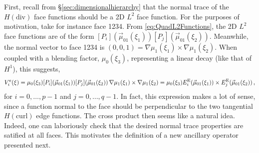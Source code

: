 First, recall from \S\ref{sec:dimensionalhierarchy} that the normal trace of the $H(\mathrm{div})$ face functions should be a 2D $L^2$ face function.
For the purposes of motivation, take for instance face 1234.
From \eqref{eq:QuadL2Functions}, the 2D $L^2$ face functions are of the form $[P_i](\vec{\mu}_{01}(\xi_1))[P_j](\vec{\mu}_{01}(\xi_2))$.
Meanwhile, the normal vector to face 1234 is $(0,0,1)=\nabla\mu_1(\xi_1)\times\nabla\mu_1(\xi_2)$.
When coupled with a blending factor, $\mu_0(\xi_3)$, representing a linear decay (like that of $H^1$), this suggests,
\begin{equation*}
    V_i^\mathrm{e}(\xi)=\mu_0(\xi_3)[P_i](\vec{\mu}_{01}(\xi_1))[P_j](\vec{\mu}_{01}(\xi_2))\,\nabla\mu_1(\xi_1)\times
    	\nabla\mu_1(\xi_2)
    		=\mu_0(\xi_3)E_i^{\mathrm{E}}(\vec{\mu}_{01}(\xi_1))\times E_j^{\mathrm{E}}(\vec{\mu}_{01}(\xi_2))\,,
\end{equation*}
for $i=0,\ldots,p-1$ and $j=0,\ldots,q-1$.
In fact, this expression makes a lot of sense, since a function normal to the face should be perpendicular to the two tangential $H(\mathrm{curl})$ edge functions. 
The cross product then seems like a natural idea.
Indeed, one can laboriously check that the desired normal trace properties are satified at all faces.
This motivates the definition of a new ancillary operator presented next.

%

